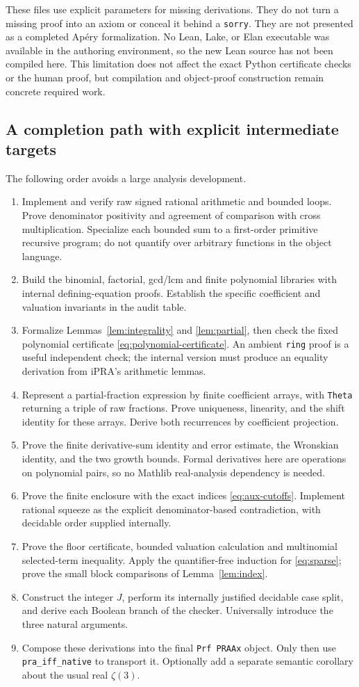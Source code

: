\documentclass[11pt]{article}
\theoremstyle{definition}\newtheorem{definition}[theorem]{Definition}
\theoremstyle{remark}\newtheorem{remark}[theorem]{Remark}
\newcommand{\code}[1]{{\small\texttt{#1}}}
\begin{document}
These files use explicit parameters for missing derivations. They do not
turn a missing proof into an axiom or conceal it behind a \code{sorry}.
They are not presented as a completed Ap\'ery formalization. No Lean, Lake,
or Elan executable was available in the authoring environment, so the new
Lean source has not been compiled here. This limitation does not affect the
exact Python certificate checks or the human proof, but compilation and
object-proof construction remain concrete required work.

\subsection{A completion path with explicit intermediate targets}
The following order avoids a large analysis development.
\begin{enumerate}
\item Implement and verify raw signed rational arithmetic and bounded loops.
Prove denominator positivity and agreement of comparison with cross
multiplication. Specialize each bounded sum to a first-order primitive
recursive program; do not quantify over arbitrary functions in the object
language.
\item Build the binomial, factorial, gcd/lcm and finite polynomial libraries
with internal defining-equation proofs. Establish the specific coefficient
and valuation invariants in the audit table.
\item Formalize Lemmas~\ref{lem:integrality} and \ref{lem:partial}, then check
the fixed polynomial certificate \eqref{eq:polynomial-certificate}.
An ambient \code{ring} proof is a useful independent check; the internal
version must produce an equality derivation from iPRA's arithmetic lemmas.
\item Represent a partial-fraction expression by finite coefficient arrays,
with \code{Theta} returning a triple of raw fractions. Prove uniqueness,
linearity, and the shift identity for these arrays. Derive both recurrences
by coefficient projection.
\item Prove the finite derivative-sum identity and error estimate, the
Wronskian identity, and the two growth bounds. Formal derivatives here are
operations on polynomial pairs, so no Mathlib real-analysis dependency is
needed.
\item Prove the finite enclosure with the exact indices
\eqref{eq:aux-cutoffs}. Implement rational squeeze as the explicit
denominator-based contradiction, with decidable order supplied internally.
\item Prove the floor certificate, bounded valuation calculation and
multinomial selected-term inequality. Apply the quantifier-free induction
for \eqref{eq:sparse}; prove the small block comparisons of
Lemma~\ref{lem:index}.
\item Construct the integer $J$, perform its internally justified decidable
case split, and derive each Boolean branch of the checker. Universally
introduce the three natural arguments.
\item Compose these derivations into the final \code{Prf PRAAx} object.
Only then use \code{pra\_iff\_native} to transport it. Optionally add a
separate semantic corollary about the usual real $\zeta(3)$.
\end{enumerate}
\end{document}

